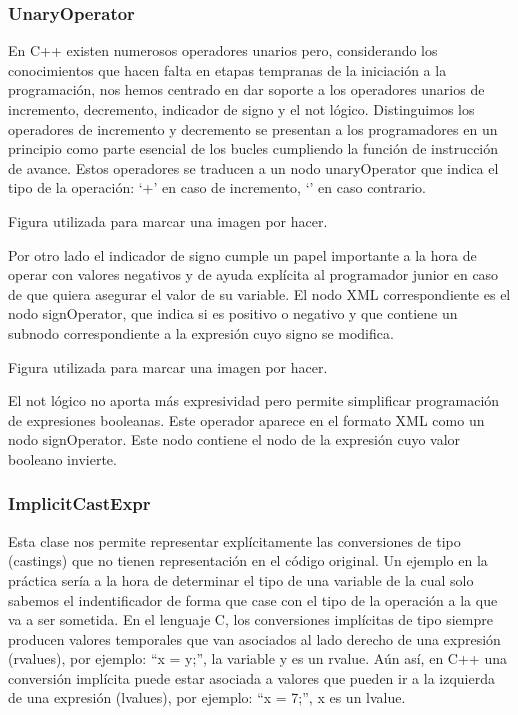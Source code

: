 \subsubsection*{UnaryOperator}

En C++ existen numerosos operadores unarios pero, considerando los conocimientos que hacen falta en etapas tempranas de la iniciaci\'on a la programaci\'on, nos hemos centrado en dar soporte a los operadores unarios de incremento, decremento, indicador de signo y el not l\'ogico. Distinguimos los operadores de incremento y decremento se presentan a los programadores en un principio como parte esencial de los bucles cumpliendo la funci\'on de instrucci\'on de avance. Estos operadores se traducen a un nodo unaryOperator que indica el tipo de la operaci\'on: ‘+’ en caso de incremento, ‘’ en caso contrario.

%
{Figura utilizada para marcar una imagen por hacer.}

Por otro lado el indicador de signo cumple un papel importante a la hora de operar con valores negativos y de ayuda expl\'icita al programador junior en caso de que quiera asegurar el valor de su variable. El nodo XML correspondiente es el nodo signOperator, que indica si es positivo o negativo y que contiene un subnodo correspondiente a la expresi\'on cuyo signo se modifica.

%
{Figura utilizada para marcar una imagen por hacer.}

El not l\'ogico no aporta m\'as expresividad pero permite simplificar programaci\'on de expresiones booleanas. Este operador aparece en el formato XML como un nodo signOperator. Este nodo contiene el nodo de la expresi\'on cuyo valor booleano invierte.

\subsubsection*{ImplicitCastExpr}

Esta clase nos permite representar expl\'icitamente las conversiones de tipo (castings) que no tienen representaci\'on en el c\'odigo original. Un ejemplo en la pr\'actica ser\'ia a la hora de determinar el tipo de una variable de la cual solo sabemos el indentificador de forma que case con el tipo de la operaci\'on a la que va a ser sometida. En el lenguaje C, los conversiones impl\'icitas de tipo siempre producen valores temporales que van asociados al lado derecho de una expresi\'on (rvalues), por ejemplo: ``x = y;'', la variable y es un rvalue. A\'un as\'i, en C++ una conversi\'on impl\'icita puede estar asociada a valores que pueden ir a la izquierda de una expresi\'on (lvalues), por ejemplo: ``x = 7;'', x es un lvalue.

